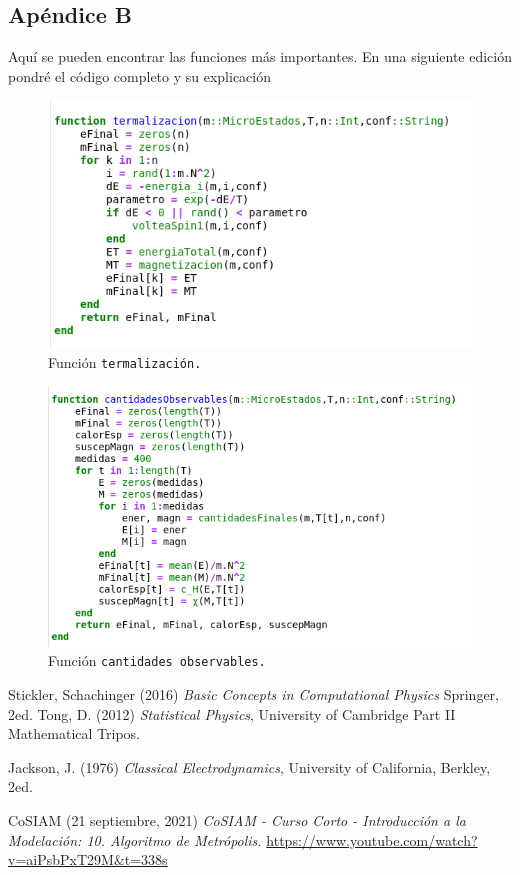 \documentclass[11pt,a4paper]{article}
\begin{document}
\subsection{Apéndice B}\label{apendice2}

Aquí se pueden encontrar las funciones más importantes. En una siguiente edición pondré el código completo y su explicación
\begin{figure}[h!]
\centering
\includegraphics[scale=0.5]{1}
\caption{Función \texttt{termalización.}}
\end{figure}
\begin{figure}[h!]
\centering
\includegraphics[scale=0.5]{2}
\caption{Función \texttt{cantidades observables.}}
\end{figure}


\begin{thebibliography}{9}
 Stickler, Schachinger (2016) \emph{Basic Concepts in Computational Physics} Springer, 2ed.
 Tong, D. (2012) \textit{Statistical Physics}, University of Cambridge Part II Mathematical Tripos.

 Jackson, J. (1976) \textit{Classical Electrodynamics}, University of California, Berkley, 2ed.

 CoSIAM (21 septiembre, 2021) \textit{CoSIAM - Curso Corto - Introducción a la Modelación: 10. Algoritmo de Metrópolis.} \url{https://www.youtube.com/watch?v=aiPsbPxT29M&t=338s}

\end{thebibliography}
\end{document}

